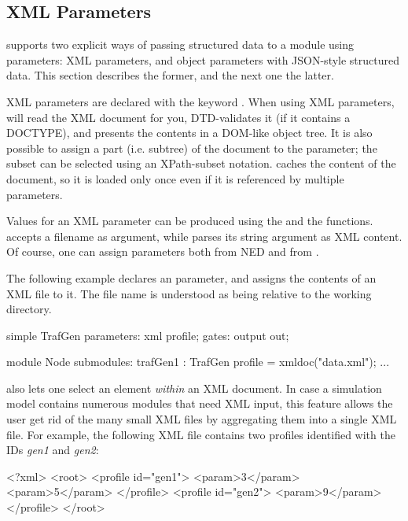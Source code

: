 \subsection{XML Parameters}
\label{sec:ned-lang:xml-parameters}

{\opp} supports two explicit ways of passing structured data to a module using
parameters: XML parameters, and object parameters with JSON-style structured data.
This section describes the former, and the next one the latter.

XML parameters are declared with the keyword . When using
XML parameters, {\opp} will read the XML document for you, DTD-validates it
(if it contains a DOCTYPE), and presents the contents in a DOM-like object tree.
It is also possible to assign a part (i.e. subtree) of the document to the parameter; the
subset can be selected using an XPath-subset notation. {\opp} caches the
content of the document, so it is loaded only once even if it is referenced
by multiple parameters.

Values for an XML parameter can be produced using the  and
the  functions.  accepts a filename as argument,
while  parses its string argument as XML content.
Of course, one can assign  parameters both from NED and
from .

The following example declares an  parameter, and assigns the
contents of an XML file to it. The file name is understood as being relative
to the working directory.

\begin{ned}
simple TrafGen {
    parameters:
        xml profile;
    gates:
        output out;
}

module Node {
    submodules:
        trafGen1 : TrafGen {
            profile = xmldoc("data.xml");
        }
        ...
}
\end{ned}

 also lets one select an element \textit{within} an XML
document. In case a simulation model contains numerous modules that need XML
input, this feature allows the user get rid of the many small XML files
by aggregating them into a single XML file. For example, the
following XML file contains two profiles identified with the IDs
\textit{gen1} and \textit{gen2}:

\begin{filelisting}
<?xml>
<root>
    <profile id="gen1">
          <param>3</param>
          <param>5</param>
    </profile>
    <profile id="gen2">
          <param>9</param>
    </profile>
</root>
\end{filelisting}

